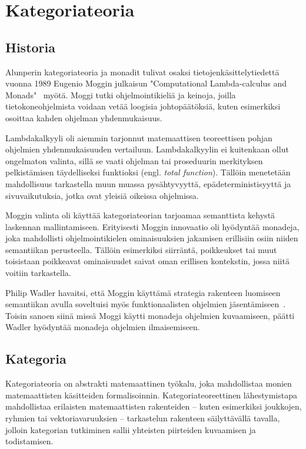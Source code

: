 \documentclass[finnish]{tktltiki2}
\begin{document}
\section{Kategoriateoria}

\subsection{Historia}

Alunperin kategoriateoria ja monadit tulivat osaksi tietojenkäsittelytiedettä vuonna 1989 Eugenio
Moggin julkaisun "Computational Lambda-calculus and Monads"~\cite{clcam89,nocam91} myötä. Moggi
tutki ohjelmointikieliä ja keinoja, joilla tietokoneohjelmista voidaan vetää loogisia
johtopäätöksiä, kuten esimerkiksi osoittaa kahden ohjelman yhdenmukaisuus.

Lambdakalkyyli oli aiemmin tarjonnut matemaattisen teoreettisen pohjan ohjelmien yhdenmukaisuuden
vertailuun. Lambdakalkyylin ei kuitenkaan ollut ongelmaton valinta, sillä se vaati ohjelman tai
proseduurin merkityksen pelkistämisen täydelliseksi funktioksi (engl. \emph{total function}).
Tällöin menetetään mahdollisuus tarkastella muun muassa pysähtyvyyttä, epädeterministisyyttä ja
sivuvaikutuksia, jotka ovat yleisiä oikeissa ohjelmissa.

Moggin valinta oli käyttää kategoriateorian tarjoamaa semanttista kehystä laskennan mallintamiseen.
Erityisesti Moggin innovaatio oli hyödyntää monadeja, joka mahdollisti ohjelmointikielen
ominaisuuksien jakamisen erillisiin osiin niiden semantiikan perusteella. Tällöin esimerkiksi
siirräntä, poikkeukset tai muut toisistaan poikkeavat ominaisuudet saivat oman erillisen kontekstin,
jossa niitä voitiin tarkastella.

Philip Wadler havaitsi, että Moggin käyttämä strategia rakenteen luomiseen semantiikan avulla
soveltuisi myös funktionaalisten ohjelmien jäsentämiseen~\cite{cm90,teofp92}. Toisin sanoen siinä
missä Moggi käytti monadeja ohjelmien kuvaamiseen, päätti Wadler hyödyntää monadeja ohjelmien
ilmaisemiseen.

\subsection{Kategoria}

Kategoriateoria on abstrakti matemaattinen työkalu, joka mahdollistaa monien matemaattisten
käsitteiden formalisoinnin. Kategoriateoreettinen lähestymistapa mahdollistaa erilaisten
matemaattisten rakenteiden -- kuten esimerkiksi joukkojen, ryhmien tai vektoriavaruuksien --
tarkastelun rakenteen säilyttävällä tavalla, jolloin kategorian tutkiminen sallii yhteisten
piirteiden kuvaamisen ja todistamisen.
\end{document}
